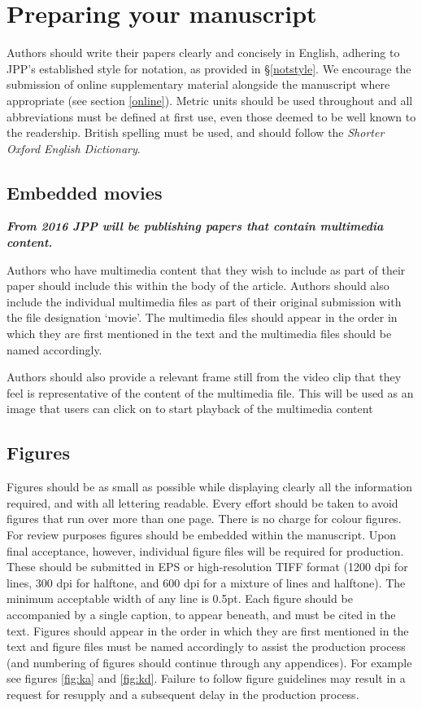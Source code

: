 \documentclass[12pt]{RBM_P}
\begin{document}
\section{Preparing your manuscript}
Authors should write their papers clearly and concisely in English, adhering to JPP's established style for notation, as provided in \S\ref{notstyle}. We encourage the submission of online supplementary material alongside the manuscript where appropriate (see section \ref{online}). Metric units should be used throughout and all abbreviations must be defined at first use, even those deemed to be well known to the readership. British spelling must be used, and should follow the \textit{Shorter Oxford English Dictionary}.

\subsection{Embedded movies}
\textbf{\textit{From 2016 JPP will be publishing papers that contain multimedia content.}} 

Authors who have multimedia content that they wish to include as part of their paper should include this within the body of the article. Authors should also include the individual multimedia files as part of their original submission with the file designation ‘movie’. The multimedia files should appear in the order in which they are first mentioned in the text and the multimedia files should be named accordingly.

Authors should also provide a relevant frame still from the video clip that they feel is representative of the content of the multimedia file. This will be used as an image that users can click on to start playback of the multimedia content


\subsection{Figures}
Figures should be as small as possible while displaying clearly all the information required, and with all lettering readable. Every effort should be taken to avoid figures that run over more than one page. There is no charge for colour figures. For review purposes figures should be embedded within the manuscript. Upon final acceptance, however, individual figure files will be required for production. These should be submitted in EPS or high-resolution TIFF format (1200 dpi for lines, 300 dpi for halftone, and 600 dpi for a mixture of lines and halftone). The minimum acceptable width of any line is 0.5pt. Each figure should be accompanied by a single caption, to appear beneath, and must be cited in the text. Figures should appear in the order in which they are first mentioned in the text and figure files must be named accordingly to assist the production process (and numbering of figures should continue through any appendices). For example see figures \ref{fig:ka} and \ref{fig:kd}. Failure to follow figure guidelines may result in a request for resupply and a subsequent delay in the production process.
\end{document}
